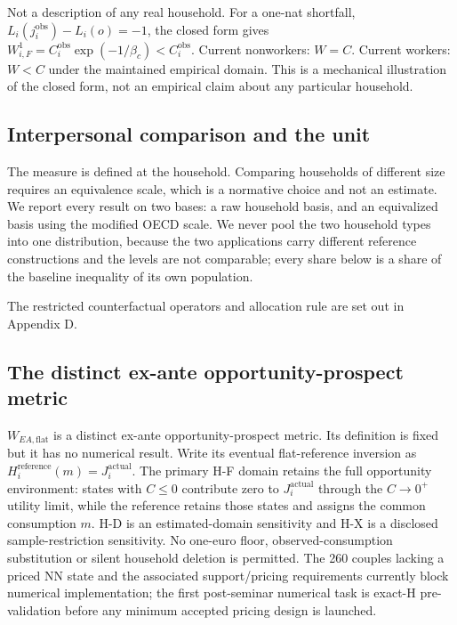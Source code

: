 \documentclass[11pt,a4paper]{article}
\begin{document}
Not a description of any real household. For a one-nat shortfall, \(L_i(j_i^{\mathrm{obs}})-L_i(o)=-1\), the closed form gives \(W^1_{i,F}=C_i^{\mathrm{obs}}\exp(-1/\beta_c)<C_i^{\mathrm{obs}}\). Current nonworkers: \(W=C\). Current workers: \(W<C\) under the maintained empirical domain. This is a mechanical illustration of the closed form, not an empirical claim about any particular household.

\subsection{Interpersonal comparison and the unit}\label{interpersonal-comparison-and-the-unit}

The measure is defined at the household. Comparing households of different size requires an equivalence scale, which is a normative choice and not an estimate. We report every result on two bases: a raw household basis, and an equivalized basis using the modified OECD scale. We never pool the two household types into one distribution, because the two applications carry different reference constructions and the levels are not comparable; every share below is a share of the baseline inequality of its own population.

The restricted counterfactual operators and allocation rule are set out in Appendix D.

\subsection{The distinct ex-ante opportunity-prospect metric}\label{the-distinct-ex-ante-opportunity-prospect-metric}

\(W_{EA,\mathrm{flat}}\) is a distinct ex-ante opportunity-prospect metric. Its definition is fixed but it has no numerical result. Write its eventual flat-reference inversion as \(H_i^{\mathrm{reference}}(m)=J_i^{\mathrm{actual}}\). The primary H-F domain retains the full opportunity environment: states with \(C\leq0\) contribute zero to \(J_i^{\mathrm{actual}}\) through the \(C\rightarrow0^+\) utility limit, while the reference retains those states and assigns the common consumption \(m\). H-D is an estimated-domain sensitivity and H-X is a disclosed sample-restriction sensitivity. No one-euro floor, observed-consumption substitution or silent household deletion is permitted. The 260 couples lacking a priced NN state and the associated support/pricing requirements currently block numerical implementation; the first post-seminar numerical task is exact-H pre-validation before any minimum accepted pricing design is launched.
\end{document}
